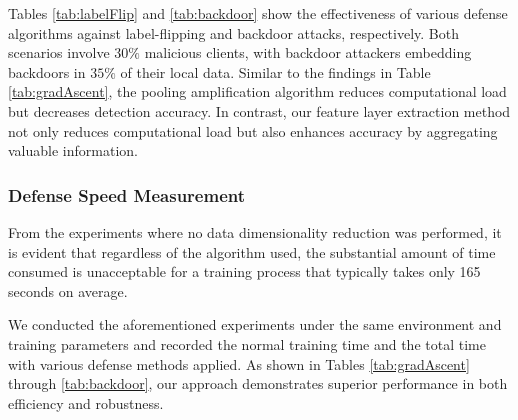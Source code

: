 \documentclass[conference]{IEEEtran}
\begin{document}
Tables \hyperref[tab:labelFlip]{\ref{tab:labelFlip}} and \hyperref[tab:backdoor]{\ref{tab:backdoor}} show the effectiveness of various defense algorithms against label-flipping and backdoor attacks, respectively. Both scenarios involve $30\%$ malicious clients, with backdoor attackers embedding backdoors in $35\%$ of their local data. Similar to the findings in Table \hyperref[tab:gradAscent]{\ref{tab:gradAscent}}, the pooling amplification algorithm reduces computational load but decreases detection accuracy. In contrast, our feature layer extraction method not only reduces computational load but also enhances accuracy by aggregating valuable information.

\subsubsection{\textbf{Defense Speed Measurement}}





From the experiments where no data dimensionality reduction was performed, it is evident that regardless of the algorithm used, the substantial amount of time consumed is unacceptable for a training process that typically takes only 165 seconds on average.

We conducted the aforementioned experiments under the same environment and training parameters and recorded the normal training time and the total time with various defense methods applied. As shown in Tables \hyperref[tab:gradAscent]{\ref{tab:gradAscent}} through \hyperref[tab:backdoor]{\ref{tab:backdoor}}, our approach demonstrates superior performance in both efficiency and robustness.
\end{document}
